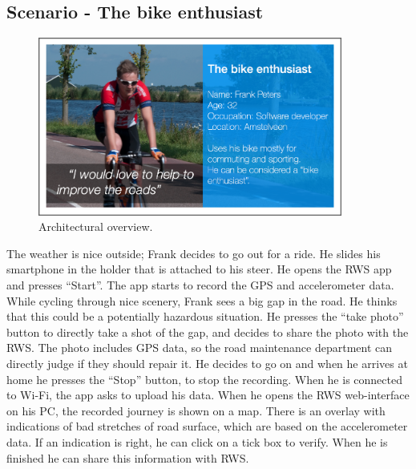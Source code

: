 \documentclass[preprint,12pt]{elsarticle}
\theoremstyle{definition}
\begin{document}
\subsection{Scenario - The bike enthusiast}
\begin{figure}[ht]
\begin{center}
\includegraphics[width=100mm]{figures/enthusiast}
\caption{Architectural overview.\label{fig:sys}}
\end{center}
\end{figure}
The weather is nice outside; Frank decides to go out for a ride. 
He slides his smartphone in the holder that is attached to his steer. He opens the RWS app and presses “Start”. The app starts to record the GPS and accelerometer data. 
While cycling through nice scenery, Frank sees a big gap in the road. He thinks that this could be a potentially hazardous situation. He presses the “take photo” button to directly take a shot of the gap, and decides to share the photo with the RWS. The photo includes GPS data, so the road maintenance department can directly judge if they should repair it. 
He decides to go on and when he arrives at home he presses the “Stop” button, to stop the recording. When he is connected to Wi-Fi, the app asks to upload his data.
When he opens the RWS web-interface on his PC, the recorded journey is shown on a map. There is an overlay with indications of bad stretches of road surface, which are based on the accelerometer data. If an indication is right, he can click on a tick box to verify. When he is finished he can share this information with RWS.  
\end{document}
